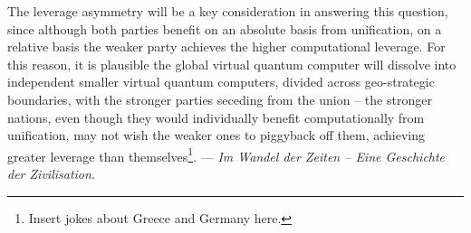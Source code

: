 The leverage asymmetry will be a key consideration in answering this question, since although both parties benefit on an absolute basis from unification, on a relative basis the weaker party achieves the higher computational leverage. For this reason, it is plausible the global virtual quantum computer will dissolve into independent smaller virtual quantum computers, divided across geo-strategic boundaries, with the stronger parties seceding from the union -- the stronger nations, even though they would individually benefit computationally from unification, may not wish the weaker ones to piggyback off them, achieving greater leverage than themselves\footnote{Insert jokes about Greece and Germany here.}. --- \textit{Im Wandel der Zeiten -- Eine Geschichte der Zivilisation.}